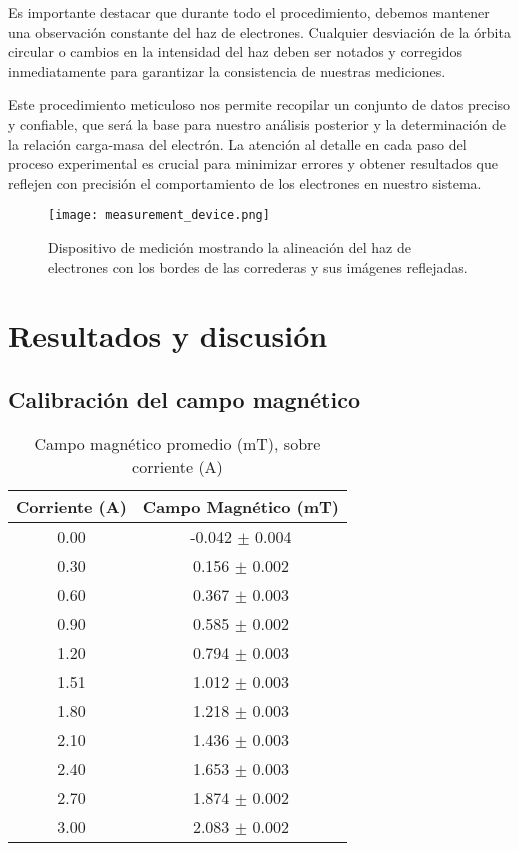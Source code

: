 \documentclass[twocolumn,a4paper,11pt]{scrartcl}
\begin{document}
Es importante destacar que durante todo el procedimiento, debemos mantener una observación constante del haz de electrones. Cualquier desviación de la órbita circular o cambios en la intensidad del haz deben ser notados y corregidos inmediatamente para garantizar la consistencia de nuestras mediciones.

Este procedimiento meticuloso nos permite recopilar un conjunto de datos preciso y confiable, que será la base para nuestro análisis posterior y la determinación de la relación carga-masa del electrón. La atención al detalle en cada paso del proceso experimental es crucial para minimizar errores y obtener resultados que reflejen con precisión el comportamiento de los electrones en nuestro sistema.

\begin{figure}[h]
    \centering
    \texttt{[image: measurement\_device.png]}
    \caption{Dispositivo de medición mostrando la alineación del haz de electrones con los bordes de las correderas y sus imágenes reflejadas.}
    \label{fig:measurement_device}
\end{figure}

\section{Resultados y discusión}
\subsection*{Calibración del campo magnético}

\begin{table}[h!]
\centering
\begin{tabular}{ |c| c | } 
\hline
Corriente (A) & Campo Magnético (mT) \\ 
\hline
0.00 & -0.042 $\pm$ 0.004 \\ 
0.30 & 0.156 $\pm$ 0.002 \\ 
0.60 & 0.367 $\pm$ 0.003 \\ 
0.90 & 0.585 $\pm$ 0.002 \\ 
1.20 & 0.794 $\pm$ 0.003 \\ 
1.51 & 1.012 $\pm$ 0.003 \\ 
1.80 & 1.218 $\pm$ 0.003 \\ 
2.10 & 1.436 $\pm$ 0.003 \\ 
2.40 & 1.653 $\pm$ 0.003 \\ 
2.70 & 1.874 $\pm$ 0.002 \\ 
3.00 & 2.083 $\pm$ 0.002 \\ 
\hline
\end{tabular}
\caption{Campo magnético promedio (mT), sobre corriente (A)}
\label{tabla:AT}
\end{table}
\end{document}
